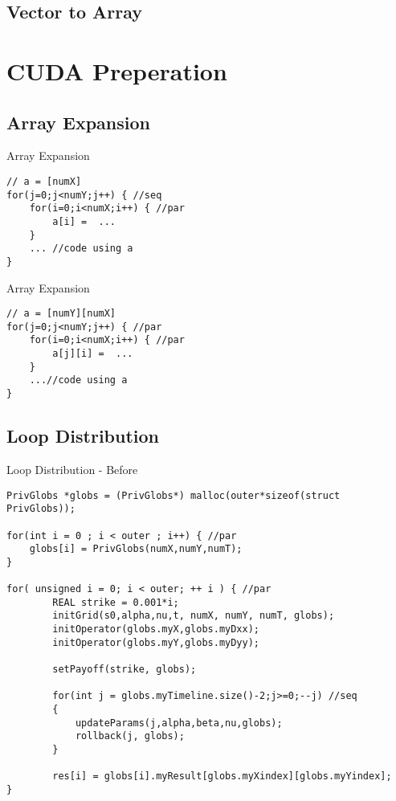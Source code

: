 \documentclass[xcolor=x11names,compress]{beamer}
\begin{document}
\subsection{Vector to Array}


\section{CUDA Preperation}
\subsection{Array Expansion}
\begin{frame}[fragile]{Array Expansion}
        \begin{verbatim}
// a = [numX]
for(j=0;j<numY;j++) { //seq
    for(i=0;i<numX;i++) { //par
        a[i] =  ...
    }
    ... //code using a
}
\end{verbatim}
\end{frame}

\begin{frame}[fragile]{Array Expansion}
\begin{verbatim}
// a = [numY][numX]
for(j=0;j<numY;j++) { //par
    for(i=0;i<numX;i++) { //par
        a[j][i] =  ...
    }
    ...//code using a
}
\end{verbatim}
\end{frame}

\subsection{Loop Distribution}
\begin{frame}[fragile]{Loop Distribution - Before}
\begin{verbatim}
PrivGlobs *globs = (PrivGlobs*) malloc(outer*sizeof(struct PrivGlobs));

for(int i = 0 ; i < outer ; i++) { //par
    globs[i] = PrivGlobs(numX,numY,numT);
}

for( unsigned i = 0; i < outer; ++ i ) { //par
        REAL strike = 0.001*i;
        initGrid(s0,alpha,nu,t, numX, numY, numT, globs);
        initOperator(globs.myX,globs.myDxx);
        initOperator(globs.myY,globs.myDyy);

        setPayoff(strike, globs);

        for(int j = globs.myTimeline.size()-2;j>=0;--j) //seq
        {
            updateParams(j,alpha,beta,nu,globs);
            rollback(j, globs);
        }

        res[i] = globs[i].myResult[globs.myXindex][globs.myYindex];
}
\end{verbatim}
\end{frame}
\end{document}
